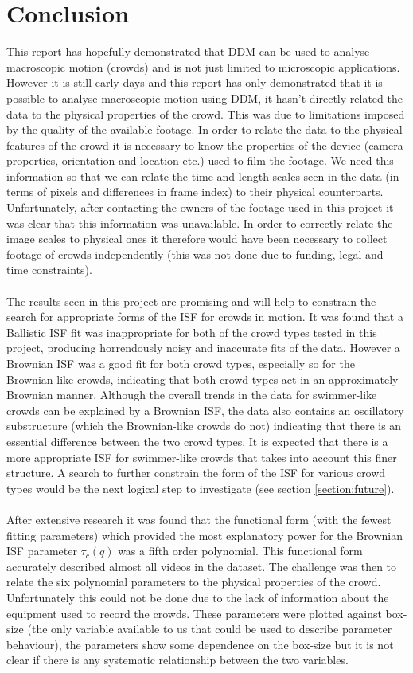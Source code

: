 \documentclass[10pt]{article}
\begin{document}
\section{Conclusion}
\label{section:conclusion}
This report has hopefully demonstrated that DDM can be used to analyse macroscopic motion (crowds) and is not just limited to microscopic applications. However it is still early days and this report has only demonstrated that it is possible to analyse macroscopic motion using DDM, it hasn't directly related the data to the physical properties of the crowd. This was due to limitations imposed by the quality of the available footage. In order to relate the data to the physical features of the crowd it is necessary to know the properties of the device (camera properties, orientation and location etc.) used to film the footage. We need this information so that we can relate the time and length scales seen in the data (in terms of pixels and differences in frame index) to their physical counterparts. Unfortunately, after contacting the owners of the footage used in this project it was clear that this information was unavailable. In order to correctly relate the image scales to physical ones it therefore would have been necessary to collect footage of crowds independently (this was not done due to funding, legal and time constraints).
\\\\
The results seen in this project are promising and will help to constrain the search for appropriate forms of the ISF for crowds in motion. It was found that a Ballistic ISF fit was inappropriate for both of the crowd types tested in this project, producing horrendously noisy and inaccurate fits of the data. However a Brownian ISF was a good fit for both crowd types, especially so for the Brownian-like crowds, indicating that both crowd types act in an approximately Brownian manner. Although the overall trends in the data for swimmer-like crowds can be explained by a Brownian ISF, the data also contains an oscillatory substructure (which the Brownian-like crowds do not) indicating that there is an essential difference between the two crowd types. It is expected that there is a more appropriate ISF for swimmer-like crowds that takes into account this finer structure. A search to further constrain the form of the ISF for various crowd types would be the next logical step to investigate (see section \ref{section:future}).
\\\\
After extensive research it was found that the functional form (with the fewest fitting parameters) which provided the most explanatory power for the Brownian ISF parameter $\tau_c(q)$ was a fifth order polynomial. This functional form accurately described almost all videos in the dataset. The challenge was then to relate the six polynomial parameters to the physical properties of the crowd. Unfortunately this could not be done due to the lack of information about the equipment used to record the crowds. These parameters were plotted against box-size (the only variable available to us that could be used to describe parameter behaviour), the parameters show some dependence on the box-size but it is not clear if there is any systematic relationship between the two variables.
\end{document}
